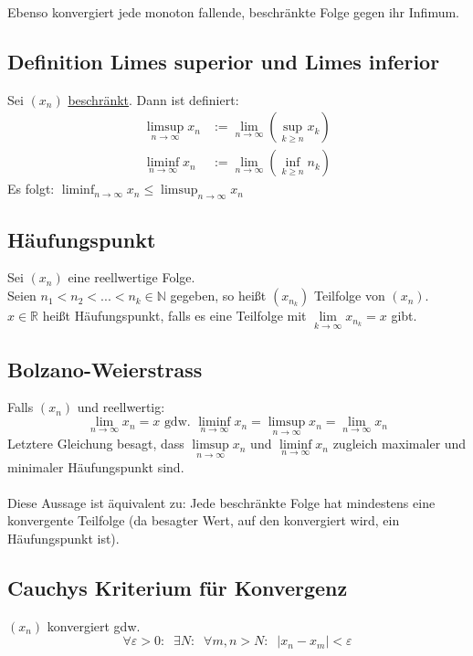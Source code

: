 \documentclass[halfparscip]{scrartcl}
\newcounter{subsection2}
\begin{document}
\noindent Ebenso konvergiert jede monoton fallende, beschränkte Folge gegen ihr Infimum.

\subsection*{Definition Limes superior und Limes inferior}
Sei $(x_n)$ \underline{beschränkt}.
Dann ist definiert:
\begin{align*}
	\limsup_{n \rightarrow \infty} x_n &:= \lim_{n \rightarrow \infty} (\sup_{k \geq n} x_k) \\
	\liminf_{n \rightarrow \infty} x_n &:= \lim_{n \rightarrow \infty} (\inf_{k \geq n} n_k)
\end{align*}
Es folgt: $\displaystyle\liminf_{n \rightarrow \infty} x_n  \leq \limsup_{n \rightarrow \infty} x_n$

\subsection{Häufungspunkt}
Sei $(x_n)$ eine reellwertige Folge. \\
Seien $n_1 < n_2 < ... < n_k \in \mathbb{N}$ gegeben, so heißt $(x_{n_k})$ Teilfolge von $(x_n)$.\\
$x \in \mathbb{R}$ heißt Häufungspunkt, falls es eine Teilfolge mit $\lim\limits_{k \rightarrow \infty} x_{n_k} = x$ gibt.

\subsection{Bolzano-Weierstrass}
Falls $(x_n)$ und reellwertig:
\begin{equation*}
	\lim_{n \rightarrow \infty} x_n = x \text{ gdw. } \liminf_{n \rightarrow \infty} x_n = \limsup_{n \rightarrow \infty} x_n = \lim_{n \rightarrow \infty} x_n
\end{equation*}
Letztere Gleichung besagt, dass $\limsup\limits_{n \rightarrow \infty} x_n$ und $\liminf\limits_{n \rightarrow \infty} x_n$ zugleich maximaler und minimaler Häufungspunkt sind.\\\\
Diese Aussage ist äquivalent zu: Jede beschränkte Folge hat mindestens eine konvergente Teilfolge (da besagter Wert, auf den konvergiert wird, ein Häufungspunkt ist).

\subsection{Cauchys Kriterium für Konvergenz}
$(x_n)$ konvergiert gdw. 
\begin{equation*}
	\forall \varepsilon > 0:\;\; \exists N : \;\; \forall m,n > N: \;\; \vert x_n - x_m\vert < \varepsilon
\end{equation*}
\end{document}
